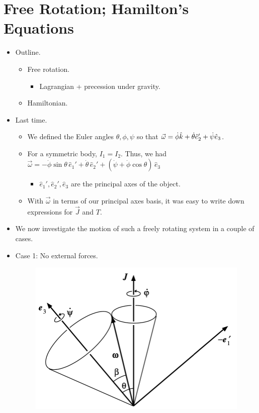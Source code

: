 \documentclass[../notes.tex]{subfiles}
\begin{document}
\section{Free Rotation; Hamilton's Equations}
\begin{itemize}
    \item {}Outline.
    \begin{itemize}
        \item Free rotation.
        \begin{itemize}
            \item Lagrangian + precession under gravity.
        \end{itemize}
        \item Hamiltonian.
    \end{itemize}
    \item Last time.
    \begin{itemize}
        \item We defined the Euler angles $\theta,\phi,\psi$ so that $\vec{\omega}=\dot{\phi}\hat{k}+\dot{\theta}\hat{e}_2'+\dot{\psi}\hat{e}_3$.
        \item For a symmetric body, $I_1=I_2$. Thus, we had $\vec{\omega}=-\dot{\phi}\sin\theta\,\hat{e}_1'+\dot{\theta}\,\hat{e}_2'+(\dot{\psi}+\dot{\phi}\cos\theta)\,\hat{e}_3$
        \begin{itemize}
            \item $\hat{e}_1',\hat{e}_2',\hat{e}_3$ are the principal axes of the object.
        \end{itemize}
        \item With $\vec{\omega}$ in terms of our principal axes basis, it was easy to write down expressions for $\vec{J}$ and $T$.
    \end{itemize}
    \item We now investigate the motion of such a freely rotating system in a couple of cases.
    \item Case 1: No external forces.
    \begin{figure}[h!]
        \centering
        \includegraphics[width=0.43\linewidth]{../ExtFiles/FreeRot1.png}

\end{figure}
\end{itemize}
\end{document}
